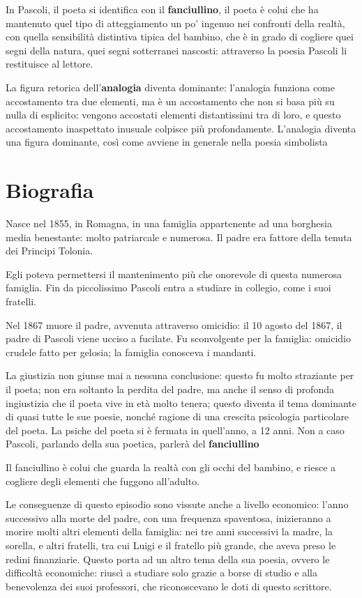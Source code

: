 \documentclass[a4paper, twoside, titlepage]{book}
\begin{document}
In Pascoli, il poeta si identifica con il \textbf{fanciullino}, il poeta è colui che ha mantenuto quel tipo di atteggiamento un po' ingenuo nei confronti della realtà, con quella sensibilità distintiva tipica del bambino, che è in grado di cogliere quei segni della natura, quei segni sotterranei nascosti: attraverso la poesia Pascoli li restituisce al lettore.

La figura retorica dell'\textbf{analogia} diventa dominante: l'analogia funziona come accostamento tra due elementi, ma è un accostamento che non si basa più su nulla di esplicito: vengono accostati elementi distantissimi tra di loro, e questo accostamento inaspettato inusuale colpisce più profondamente.
L'analogia diventa una figura dominante, così come avviene in generale nella poesia simbolista


\section{Biografia}

Nasce nel 1855, in Romagna, in una famiglia appartenente ad una borghesia media benestante: molto patriarcale e numerosa. Il padre era fattore della tenuta dei Principi Tolonia.

Egli poteva permettersi il mantenimento più che onorevole di questa numerosa famiglia.
Fin da piccolissimo Pascoli entra a studiare in collegio, come i suoi fratelli.

Nel 1867 muore il padre, avvenuta attraverso omicidio: il 10 agosto del 1867, il padre di Pascoli viene ucciso a fucilate. Fu sconvolgente per la famiglia: omicidio crudele fatto per gelosia; la famiglia conosceva i mandanti.

La giustizia non giunse mai a nessuna conclusione: questo fu molto straziante per il poeta; non era soltanto la perdita del padre, ma anche il senso di profonda ingiustizia che il poeta vive in età molto tenera; questo diventa il tema dominante di quasi tutte le sue poesie, nonché ragione di una crescita psicologia particolare del poeta. La psiche del poeta si è fermata in quell'anno, a 12 anni.
Non a caso Pascoli, parlando della sua poetica, parlerà del \textbf{fanciullino}

Il fanciullino è colui che guarda la realtà con gli occhi del bambino, e riesce a cogliere degli elementi che fuggono all'adulto.

Le conseguenze di questo episodio sono vissute anche a livello economico: l'anno successivo alla morte del padre, con una frequenza spaventosa, inizieranno a morire molti altri elementi della famiglia: nei tre anni successivi la madre, la sorella, e altri fratelli, tra cui Luigi e il fratello più grande, che aveva preso le redini finanziarie.
Questo porta ad un altro tema della sua poesia, ovvero le difficoltà economiche: riuscì a studiare solo grazie a borse di studio e alla benevolenza dei suoi professori, che riconoscevano le doti di questo scrittore.
\end{document}

